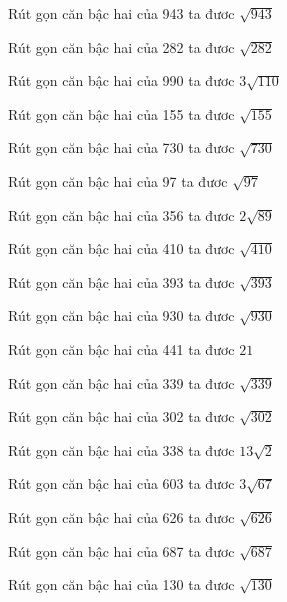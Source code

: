 \documentclass[12pt,a4paper]{article}
\begin{document}
\begin{ex}
Rút gọn căn bậc hai của 943 ta đươc $\sqrt{943}$
\end{ex}
\begin{ex}
Rút gọn căn bậc hai của 282 ta đươc $\sqrt{282}$
\end{ex}
\begin{ex}
Rút gọn căn bậc hai của 990 ta đươc $3\sqrt{110}$
\end{ex}
\begin{ex}
Rút gọn căn bậc hai của 155 ta đươc $\sqrt{155}$
\end{ex}
\begin{ex}
Rút gọn căn bậc hai của 730 ta đươc $\sqrt{730}$
\end{ex}
\begin{ex}
Rút gọn căn bậc hai của 97 ta đươc $\sqrt{97}$
\end{ex}
\begin{ex}
Rút gọn căn bậc hai của 356 ta đươc $2\sqrt{89}$
\end{ex}
\begin{ex}
Rút gọn căn bậc hai của 410 ta đươc $\sqrt{410}$
\end{ex}
\begin{ex}
Rút gọn căn bậc hai của 393 ta đươc $\sqrt{393}$
\end{ex}
\begin{ex}
Rút gọn căn bậc hai của 930 ta đươc $\sqrt{930}$
\end{ex}
\begin{ex}
Rút gọn căn bậc hai của 441 ta đươc $21$
\end{ex}
\begin{ex}
Rút gọn căn bậc hai của 339 ta đươc $\sqrt{339}$
\end{ex}
\begin{ex}
Rút gọn căn bậc hai của 302 ta đươc $\sqrt{302}$
\end{ex}
\begin{ex}
Rút gọn căn bậc hai của 338 ta đươc $13\sqrt{2}$
\end{ex}
\begin{ex}
Rút gọn căn bậc hai của 603 ta đươc $3\sqrt{67}$
\end{ex}
\begin{ex}
Rút gọn căn bậc hai của 626 ta đươc $\sqrt{626}$
\end{ex}
\begin{ex}
Rút gọn căn bậc hai của 687 ta đươc $\sqrt{687}$
\end{ex}
\begin{ex}
Rút gọn căn bậc hai của 130 ta đươc $\sqrt{130}$
\end{ex}
\end{document}
